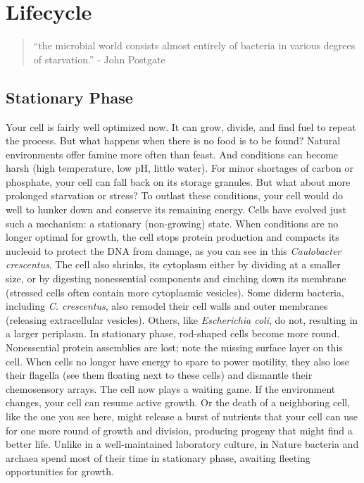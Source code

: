 \documentclass[]{tufte-book}
\begin{document}
\hypertarget{lifecycle}{%
\chapter{Lifecycle}\label{lifecycle}}

\begin{quote}
``the microbial world consists almost entirely of bacteria in various degrees of starvation.''
- John Postgate \citep{postgate1994}
\end{quote}

\hypertarget{stationary-phase}{%
\section{Stationary Phase}\label{stationary-phase}}

Your cell is fairly well optimized now. It can grow, divide, and find fuel to repeat the process. But what happens when there is no food is to be found? Natural environments offer famine more often than feast. And conditions can become harsh (high temperature, low pH, little water). For minor shortages of carbon or phosphate, your cell can fall back on its storage granules. But what about more prolonged starvation or stress? To outlast these conditions, your cell would do well to hunker down and conserve its remaining energy. Cells have evolved just such a mechanism: a stationary (non-growing) state. When conditions are no longer optimal for growth, the cell stops protein production and compacts its nucleoid to protect the DNA from damage, as you can see in this \emph{Caulobacter crescentus}. The cell also shrinks, its cytoplasm either by dividing at a smaller size, or by digesting nonessential components and cinching down its membrane (stressed cells often contain more cytoplasmic vesicles). Some diderm bacteria, including \emph{C. crescentus}, also remodel their cell walls and outer membranes (releasing extracellular vesicles). Others, like \emph{Escherichia coli}, do not, resulting in a larger periplasm. In stationary phase, rod-shaped cells become more round. Nonessential protein assemblies are lost; note the missing surface layer on this cell. When cells no longer have energy to spare to power motility, they also lose their flagella (see them floating next to these cells) and dismantle their chemosensory arrays. The cell now plays a waiting game. If the environment changes, your cell can resume active growth. Or the death of a neighboring cell, like the one you see here, might release a burst of nutrients that your cell can use for one more round of growth and division, producing progeny that might find a better life. Unlike in a well-maintained laboratory culture, in Nature bacteria and archaea spend most of their time in stationary phase, awaiting fleeting opportunities for growth.
\end{document}
